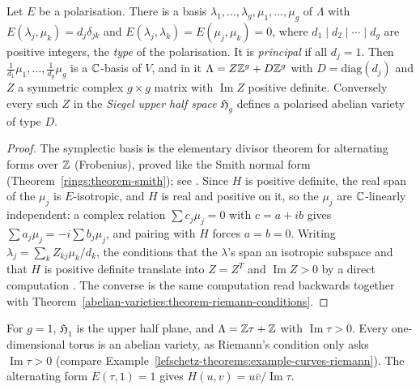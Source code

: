 \begin{proposition}\label{abelian-varieties:proposition-period-matrix}
Let $E$ be a polarisation. There is a basis $\lambda_1, \ldots, \lambda_g, \mu_1, \ldots, \mu_g$ of $\Lambda$ with
$E(\lambda_j, \mu_k) = d_j\delta_{jk}$ and $E(\lambda_j, \lambda_k) = E(\mu_j, \mu_k) = 0$, where $d_1 \mid d_2 \mid \cdots \mid d_g$ are positive integers, the \emph{type} of the polarisation.
It is \emph{principal} if all $d_j = 1$. Then $\frac{1}{d_1}\mu_1, \ldots, \frac{1}{d_g}\mu_g$ is a $\mathbb{C}$-basis of $V$, and in it $\Lambda = Z\mathbb{Z}^g + D\mathbb{Z}^g$ with $D = \mathrm{diag}(d_j)$
and $Z$ a symmetric complex $g \times g$ matrix with $\operatorname{Im}Z$ positive definite. Conversely every such $Z$ in the \emph{Siegel upper half space} $\mathfrak{H}_g$ defines a
polarised abelian variety of type $D$.
\end{proposition}

\begin{proof}
The symplectic basis is the elementary divisor theorem for alternating forms over $\mathbb{Z}$ (Frobenius), proved like the Smith normal form (Theorem~\ref{rings:theorem-smith}); see
\cite{birkenhake-lange}. Since $H$ is positive definite, the real span of the $\mu_j$ is $E$-isotropic, and $H$ is real and positive on it, so the $\mu_j$ are $\mathbb{C}$-linearly
independent: a complex relation $\sum c_j\mu_j = 0$ with $c = a + ib$ gives $\sum a_j\mu_j = -i\sum b_j\mu_j$, and pairing with $H$ forces $a = b = 0$. Writing
$\lambda_j = \sum_kZ_{kj}\mu_k/d_k$, the conditions that the $\lambda$'s span an isotropic subspace and that $H$ is positive definite translate into $Z = Z^T$ and
$\operatorname{Im}Z > 0$ by a direct computation \cite{birkenhake-lange}. The converse is the same computation read backwards together with
Theorem~\ref{abelian-varieties:theorem-riemann-conditions}.
\end{proof}

\begin{example}\label{abelian-varieties:example-dimension-one}
For $g = 1$, $\mathfrak{H}_1$ is the upper half plane, and $\Lambda = \mathbb{Z}\tau + \mathbb{Z}$ with $\operatorname{Im}\tau > 0$. Every one-dimensional torus is an abelian variety, as Riemann's
condition only asks $\operatorname{Im}\tau > 0$ (compare Example~\ref{lefschetz-theorems:example-curves-riemann}). The alternating form $E(\tau, 1) = 1$ gives
$H(u, v) = u\bar v/\operatorname{Im}\tau$.
\end{example}

